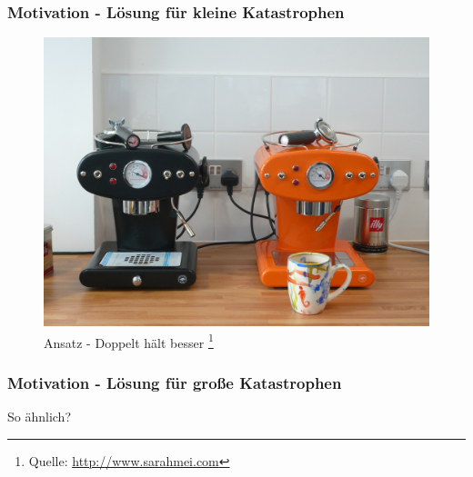 %
%
%
\begin{frame}
	\frametitle{Motivation - Lösung für kleine Katastrophen}
	\begin{figure}
		\includegraphics[scale=0.2]{grafiken/working}		
		\caption{Ansatz - Doppelt hält besser
			\footnote{\tiny Quelle: \url{http://www.sarahmei.com} }
		}		
	\end{figure}
\end{frame}
%
%
%
\begin{frame}
	\frametitle{Motivation - Lösung für große Katastrophen}

	\begin{center}
		{\huge So ähnlich?}
	\end{center}
\end{frame}
%
%
%
